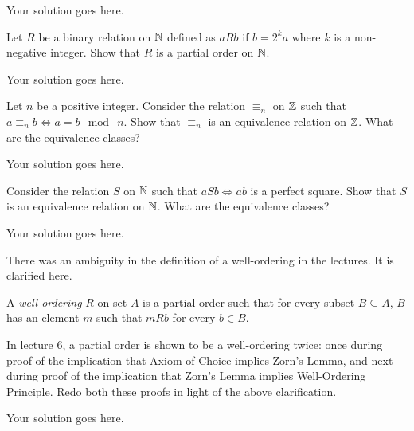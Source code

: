 \documentclass[12pt]{article}
\begin{document}
    \begin{solution}
        Your solution goes here.
    \end{solution}

    \begin{question}
        Let $R$ be a binary relation on $\mathbb{N}$ defined as $aRb$ if $b = 2^k a$ where $k$ is a non-negative integer. Show that $R$ is a partial order on $\mathbb{N}$.
    \end{question}
    
    \begin{solution}
        Your solution goes here.
    \end{solution}

    \begin{question}
        Let $n$ be a positive integer. Consider the relation $\equiv_n$ on $\mathbb{Z}$ such that $a \equiv_n b \iff a = b \mod \ n$. Show that $\equiv_n$ is an equivalence relation on $\mathbb{Z}$. What are the equivalence classes?
    \end{question}

    \begin{solution}
        Your solution goes here.
    \end{solution}
		
    \begin{question}
        Consider the relation $S$ on $\mathbb{N}$ such that $aSb \iff ab$ is a perfect square. Show that $S$ is an equivalence relation on $\mathbb{N}$. What are the equivalence classes?
    \end{question}
    
    \begin{solution}
        Your solution goes here.
    \end{solution}

    \begin{question}
        There was an ambiguity in the definition of a well-ordering in the lectures. It is clarified here. 
        
        A {\em well-ordering} $R$ on set $A$ is a partial order such that for every subset $B\subseteq A$, $B$ has an element $m$ such that $mRb$ for every $b\in B$.
        
        In lecture 6, a partial order is shown to be a well-ordering twice: once during proof of the implication that Axiom of Choice implies Zorn's Lemma, and next during proof of the implication that Zorn's Lemma implies Well-Ordering Principle. Redo both these proofs in light of the above clarification.
    \end{question}

    \begin{solution}
        Your solution goes here.
    \end{solution}

    
    
\end{document}
